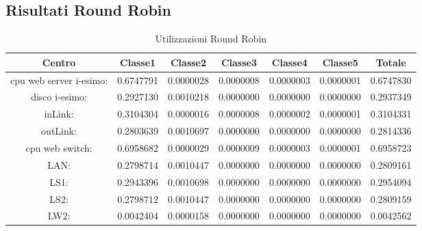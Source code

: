 \subsection{Risultati Round Robin}
\begin{table}[H]
\begin{center}\begin{scriptsize}
\begin{tabular}{||c|c|c|c|c|c|c||}
\hline
Centro &Classe1 &Classe2 &Classe3 &Classe4 &Classe5 &Totale\\
\hline
\hline
 cpu web server i-esimo: 	&0.6747791	&0.0000028	&0.0000008	&0.0000003	&0.0000001	&0.6747830\\
\hline
 disco i-esimo: 	&0.2927130	&0.0010218	&0.0000000	&0.0000000	&0.0000000	&0.2937349\\
\hline
 inLink: 	&0.3104304	&0.0000016	&0.0000008	&0.0000002	&0.0000001	&0.3104331\\
\hline
 outLink: 	&0.2803639	&0.0010697	&0.0000000	&0.0000000	&0.0000000	&0.2814336\\
\hline
 cpu web switch: 	&0.6958682	&0.0000029	&0.0000009	&0.0000003	&0.0000001	&0.6958723\\
\hline
 LAN: 	&0.2798714	&0.0010447	&0.0000000	&0.0000000	&0.0000000	&0.2809161\\
\hline
 LS1: 	&0.2943396	&0.0010698	&0.0000000	&0.0000000	&0.0000000	&0.2954094\\
\hline
 LS2:	&0.2798712	&0.0010447	&0.0000000	&0.0000000	&0.0000000	&0.2809159\\
\hline
 LW2: 	&0.0042404	&0.0000158	&0.0000000	&0.0000000	&0.0000000	&0.0042562\\
\hline
\end{tabular}
\end{scriptsize}\end{center}
\caption{Utilizzazioni Round Robin}
\label{utilizzazioni}
\end{table}

